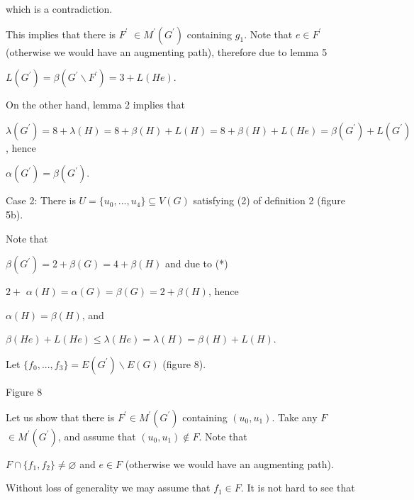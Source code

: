 \documentclass{article}
\begin{document}
which is a contradiction.

This implies that there is $F^{\prime }$ $\in M^{\prime }(G^{\prime })$
containing $g_{1}$. Note that $e\in F^{\prime }$ (otherwise we would have an
augmenting path), therefore due to lemma 5

\begin{center}
$L(G^{\prime })=\beta (G^{\prime }\backslash F^{\prime })=3+L(He)$.
\end{center}

On the other hand, lemma 2 implies that

\begin{center}
$\lambda (G^{\prime })=8+\lambda (H)=8+\beta (H)+L(H)=8+\beta
(H)+L(He)=\beta (G^{\prime })+L(G^{\prime })$, hence

$\alpha (G^{\prime })=\beta (G^{\prime })$.
\end{center}

Case 2: There is $U=\{u_{0},...,u_{4}\}\subseteq V(G)$ satisfying (2) of
definition 2 (figure 5b).

Note that

\begin{center}
$\beta (G^{\prime })=2+\beta (G)=4+\beta (H)$ and due to (*)

$2+$ $\alpha (H)=\alpha (G)=\beta (G)=2+\beta (H)$, hence

$\alpha (H)=\beta (H)$, and

$\beta (He)+L(He)\leq \lambda (He)=\lambda (H)=\beta (H)+L(H)$.
\end{center}

Let $\{f_{0},...,f_{3}\}=E(G^{\prime })\backslash E(G)$ (figure 8).

\begin{center}

Figure 8\bigskip
\end{center}

Let us show that there is $F^{\prime }\in M^{\prime }(G^{\prime })$
containing $(u_{0},u_{1})$. Take any $F$ $\in M^{\prime }(G^{\prime })$, and
assume that $(u_{0},u_{1})\notin F$. Note that

\begin{center}
$F\cap \{f_{1},f_{2}\}\neq \varnothing $ and $e\in F$ (otherwise we would
have an augmenting path).
\end{center}

Without loss of generality we may assume that $f_{1}\in F$. It is not hard
to see that
\end{document}
